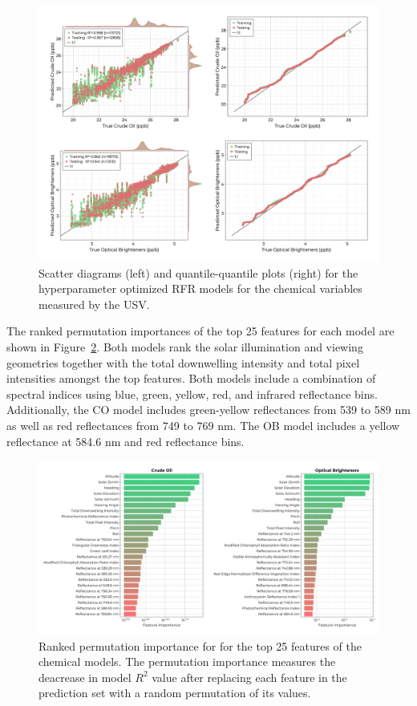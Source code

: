 \documentclass[remotesensing,article,submit,pdftex,moreauthors]{Definitions/mdpi}
\begin{document}
\begin{figure}
\centering
\includegraphics[width=\columnwidth]{paper/figures/results/fits/chemical-fitres.png}
\caption{Scatter diagrams (left) and quantile-quantile plots (right) for the hyperparameter optimized RFR models for the chemical variables measured by the USV.\label{fig:chemicals-fit}}
\end{figure}  

The ranked permutation importances of the top 25 features for each model are shown in Figure~\ref{fig:chemicals-fi}. Both models rank the solar illumination and viewing geometries together with the total downwelling intensity and total pixel intensities amongst the top features. Both models include a combination of spectral indices using blue, green, yellow, red, and infrared reflectance bins. Additionally, the CO model includes green-yellow reflectances from 539 to 589 nm as well as red reflectances from 749 to 769 nm. The OB model includes a yellow reflectance at 584.6 nm and red reflectance bins.

\begin{figure}
\centering
\includegraphics[width=\columnwidth]{paper/figures/results/fits/chemical-ranking.pdf}
\caption{Ranked permutation importance for for the top 25 features of the chemical models. The permutation importance measures the deacrease in model $R^2$ value after replacing each feature in the prediction set with a random permutation of its values.\label{fig:chemicals-fi}}
\end{figure}  
\end{document}
